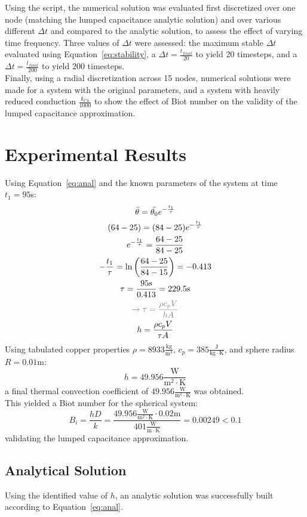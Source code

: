 \documentclass[12pt]{article}
\begin{document}
Using the \Python script, the numerical solution was evaluated first discretized over one node (matching the lumped capacitance analytic solution) and over various different $\Delta t$ and compared to the analytic solution, to assess the effect of varying time frequency.
Three values of $\Delta t$ were assessed: the maximum stable $\Delta t$ evaluated using Equation~\ref{eq:stability}, a $\Delta t=\frac{t_{final}}{20}$ to yield 20 timesteps, and a $\Delta t = \frac{t_{final}}{200}$ to yield 200 timesteps.\\

Finally, using a radial discretization across 15 nodes, numerical solutions were made for a system with the original parameters, and a system with heavily reduced conduction $\frac{k_{Cu}}{1000}$ to show the effect of Biot number on the validity of the lumped capacitance approximation.
\section{Experimental Results}\label{sec:results}
Using Equation~\ref{eq:anal} and the known parameters of the system at time $t_1=95$s:
\begin{gather*}
    \bar{\theta}=\bar{\theta_0}e^{-\frac{t_1}{\tau}}\\
    (64-25)=(84-25)e^{-\frac{t_1}{\tau}}\\
    e^{-\frac{t_1}{\tau}}=\frac{64-25}{84-25}\\
    -\frac{t_1}{\tau}=\ln{\left(\frac{64-25}{84-15}\right)}=-0.413\\
    \tau=\frac{95\mathrm{s}}{0.413}=229.5\mathrm{s}\\
    \note \tau = \frac{\rho c_pV}{hA}\\
    h = \frac{\rho c_p V}{\tau A}
\end{gather*}
Using tabulated copper properties $\rho=8933\mathrm{\frac{kg}{m^3}}$, $c_p=385\mathrm{\frac{J}{kg\cdot K}}$, and sphere radius $R=0.01\mathrm{m}$:
\begin{equation}
    h = 49.956\mathrm{\frac{W}{m^2\cdot K}}
\end{equation}
a final thermal convection coefficient of $ 49.956\mathrm{\frac{W}{m^2\cdot K}}$\xspace was obtained.\\

This yielded a Biot number for the spherical system:
\begin{equation}
    B_i=\frac{hD}{k}=\frac{49.956\mathrm{\frac{W}{m^2\cdot K}}\cdot 0.02\mathrm{m}}{401\mathrm{\frac{W}{m\cdot K}}}=0.00249<0.1
\end{equation}
validating the lumped capacitance approximation.
\FloatBarrier\subsection{Analytical Solution}
Using the identified value of $h$, an analytic solution was successfully built according to Equation~\ref{eq:anal}.\\
\end{document}
